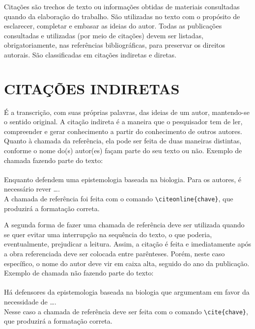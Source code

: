 Citações são trechos de texto ou informações obtidas de materiais consultadas quando da elaboração do trabalho. São utilizadas no texto com o propósito de esclarecer, completar e embasar as ideias do autor. Todas as publicações consultadas e utilizadas (por meio de citações) devem ser listadas, obrigatoriamente, nas referências bibliográficas, para preservar os direitos autorais. São classificadas em citações indiretas e diretas.

\chapter{CITAÇÕES INDIRETAS}
\label{chap:citacoesLivres}

É a transcrição, com suas próprias palavras, das ideias de um autor, mantendo-se o sentido original. A citação indireta é a maneira que o pesquisador tem de ler, compreender e gerar conhecimento a partir do conhecimento de outros autores. Quanto à chamada da referência, ela pode ser feita de duas maneiras distintas, conforme o nome do(s) autor(es) façam parte do seu texto ou não. Exemplo de chamada fazendo parte do texto:\\
\\Enquanto {} defendem uma epistemologia baseada na biologia. Para os autores, é necessário rever \ldots.\\

A chamada de referência foi feita com o comando \verb|\citeonline{chave}|, que produzirá a formatação correta.

A segunda forma de fazer uma chamada de referência deve ser utilizada quando se quer evitar uma interrupção na sequência do texto, o que poderia, eventualmente, prejudicar a leitura. Assim, a citação é feita e imediatamente após a obra referenciada deve ser colocada entre parênteses. Porém, neste caso específico, o nome do autor deve vir em caixa alta, seguido do ano da publicação. Exemplo de chamada não fazendo parte do texto:\\
\\Há defensores da epistemologia baseada na biologia que argumentam em favor da necessidade de \ldots \cite{Maturana2003}.\\

Nesse caso a chamada de referência deve ser feita com o comando \verb|\cite{chave}|, que produzirá a formatação correta.

